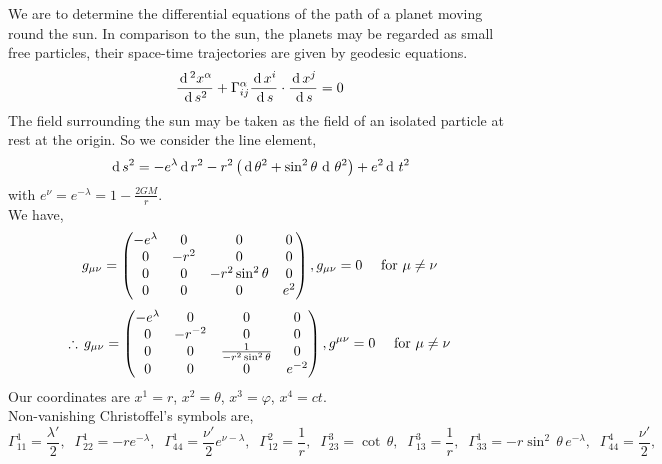 \documentclass[../main-sheet.tex]{subfiles}
\begin{document}
    \begin{soln}
        We are to determine the differential equations of the path of a planet moving round the sun. In comparison to the sun, the planets may be regarded as small free particles, their space-time trajectories are given by geodesic equations.
        \begin{equation}
            \frac{\,\mathrm{d}\,^2 x^\alpha}{\,\mathrm{d}\, s^2}+\Gamma_{ij}^\alpha \frac{\,\mathrm{d}\, x^i}{\,\mathrm{d}\, s}\cdot \frac{\,\mathrm{d}\, x^j}{\,\mathrm{d}\, s}=0\label{eq:planet1}
        \end{equation}
        The field surrounding the sun may be taken as the field of an isolated particle at rest at the origin. So we consider the line element,
        \begin{equation}
            \,\mathrm{d}\, s^2=-e^\lambda\,\mathrm{d}\, r^2-r^2\left( \,\mathrm{d}\, \theta^2+\sin^2\theta\,\,\mathrm{d}\,\,\theta^2 \right)+e^2\,\mathrm{d}\,\,t^2
            \label{eq:planet2}
        \end{equation}
        with \(\displaystyle e^\nu=e^{-\lambda}=1-\frac{2GM}{r}\).\\
        We have,
        \[
            g_{\mu\nu}=\begin{pmatrix}
            -e^\lambda & 0 & 0& 0\\
            0 & -r^2 & 0& 0\\
            0& 0 & -r^2 \sin^2\theta & 0\\
            0& 0 & 0 & e^2
        \end{pmatrix},g_{{\mu\nu}}=0\quad\text{ for }\mu\neq \nu
        \]
        \[
            \therefore \,g_{\mu\nu}=\begin{pmatrix}
            -e^\lambda & 0 & 0& 0\\
            0 & -r^{-2} & 0& 0\\
            0& 0 & \frac{1}{-r^2 \sin^2\theta} & 0\\
            0& 0 & 0 & e^{-2}
        \end{pmatrix},g^{{\mu\nu}}=0\quad\text{ for }\mu\neq \nu
        \]
        Our coordinates are \(x^1=r\), \(x^2=\theta\), \(x^3=\varphi\), \(x^4=ct\).\\
        Non-vanishing Christoffel's symbols are,
        \[
            \Gamma_{11}^1=\frac{\lambda '}{2},\;\;
            \Gamma_{22}^1=-r e^{-\lambda},\;\;
            \Gamma_{44}^1=\frac{\nu '}{2}e^{\nu-\lambda},\;\;
            \Gamma_{12}^2=\frac{1}{r},\;\;
            \Gamma_{23}^3=\cot\,\theta,\;\;
            \Gamma_{13}^3=\frac{1}{r},\;\;
            \Gamma_{33}^1=-r \sin^2\,\theta\,e^{-\lambda},\;\;
            \Gamma_{44}^4=\frac{\nu'}{2},\;\;
\]
\end{soln}
\end{document}
